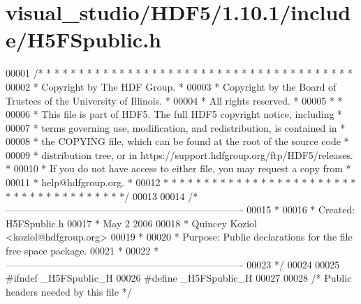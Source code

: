 \hypertarget{visual__studio_2_h_d_f5_21_810_81_2include_2_h5_f_spublic_8h_source}{}\section{visual\+\_\+studio/\+H\+D\+F5/1.10.1/include/\+H5\+F\+Spublic.h}
\label{visual__studio_2_h_d_f5_21_810_81_2include_2_h5_f_spublic_8h_source}

\begin{DoxyCode}
00001 \textcolor{comment}{/* * * * * * * * * * * * * * * * * * * * * * * * * * * * * * * * * * * * * * *}
00002 \textcolor{comment}{ * Copyright by The HDF Group.                                               *}
00003 \textcolor{comment}{ * Copyright by the Board of Trustees of the University of Illinois.         *}
00004 \textcolor{comment}{ * All rights reserved.                                                      *}
00005 \textcolor{comment}{ *                                                                           *}
00006 \textcolor{comment}{ * This file is part of HDF5.  The full HDF5 copyright notice, including     *}
00007 \textcolor{comment}{ * terms governing use, modification, and redistribution, is contained in    *}
00008 \textcolor{comment}{ * the COPYING file, which can be found at the root of the source code       *}
00009 \textcolor{comment}{ * distribution tree, or in https://support.hdfgroup.org/ftp/HDF5/releases.  *}
00010 \textcolor{comment}{ * If you do not have access to either file, you may request a copy from     *}
00011 \textcolor{comment}{ * help@hdfgroup.org.                                                        *}
00012 \textcolor{comment}{ * * * * * * * * * * * * * * * * * * * * * * * * * * * * * * * * * * * * * * */}
00013 
00014 \textcolor{comment}{/*-------------------------------------------------------------------------}
00015 \textcolor{comment}{ *}
00016 \textcolor{comment}{ * Created:             H5FSpublic.h}
00017 \textcolor{comment}{ *                      May  2 2006}
00018 \textcolor{comment}{ *                      Quincey Koziol <koziol@hdfgroup.org>}
00019 \textcolor{comment}{ *}
00020 \textcolor{comment}{ * Purpose:             Public declarations for the file free space package.}
00021 \textcolor{comment}{ *}
00022 \textcolor{comment}{ *-------------------------------------------------------------------------}
00023 \textcolor{comment}{ */}
00024 
00025 \textcolor{preprocessor}{#ifndef \_H5FSpublic\_H}
00026 \textcolor{preprocessor}{#define \_H5FSpublic\_H}
00027 
00028 \textcolor{comment}{/* Public headers needed by this file */}

\end{DoxyCode}
